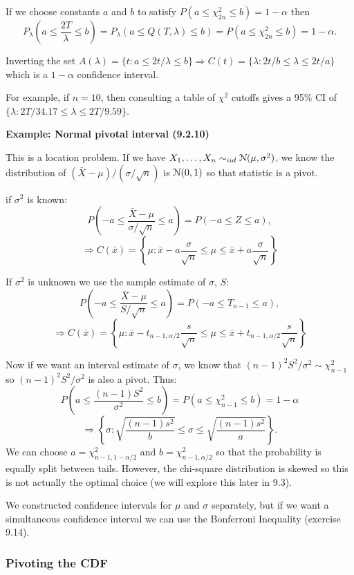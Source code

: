 \documentclass[11pt,]{article}
\newcommand{\Xndots}{X_1, \ldots, X_n}
\def\xbar{\bar{ x}}
\def\Xbar{\bar{ X}}
\def\Nsc{{\cal N}}
\begin{document}
If we choose constants \(a\) and \(b\) to satisfy
\(P(a \leq \chi^2_{2n} \leq b) = 1 - \alpha\) then
\[P_\lambda\left( a \leq \frac{2T}{\lambda} \leq b \right) = P_\lambda (a \leq Q(T,\lambda) \leq b) = P(a \leq \chi^2_{2n} \leq b) = 1 - \alpha.\]

Inverting the set
\(A(\lambda) = \{t: a \leq {2t/\lambda} \leq b\} \Rightarrow C(t) = \{ \lambda: 2t/b \leq \lambda \leq 2t/a\}\)
which is a \(1-\alpha\) confidence interval.

For example, if \(n=10\), then consulting a table of \(\chi^2\) cutoffs
gives a 95\% CI of \(\{\lambda: 2T/34.17 \leq \lambda \leq 2T/9.59\}.\)

\noindent\textbf{Example: Normal pivotal interval (9.2.10)}

This is a location problem. If we have
\(\Xndots \sim_{iid} \Nsc(\mu,\sigma^2)\), we know the distribution of
\((\Xbar - \mu)/(\sigma/\sqrt{n})\) is \(\Nsc(0,1)\) so that statistic
is a pivot.

if \(\sigma^2\) is known:
\[P\left(-a \leq \frac{\Xbar - \mu}{\sigma/\sqrt{n}} \leq a\right) = P(-a \leq Z \leq a),\]
\[ \Rightarrow C(\xbar) = \left\{ \mu: \xbar - a \frac{\sigma}{\sqrt{n}} \leq \mu \leq \xbar +  a \frac{\sigma}{\sqrt{n}}\right\}\]

If \(\sigma^2\) is unknown we use the sample estimate of \(\sigma\),
\(S\):
\[P\left(-a \leq \frac{\Xbar - \mu}{S/\sqrt{n}} \leq a\right) = P(-a \leq T_{n-1} \leq a),\]
\[ \Rightarrow C(\xbar) = \left\{ \mu: \xbar - t_{n-1,\alpha/2} \frac{s}{\sqrt{n}} \leq \mu \leq \xbar +  t_{n-1,\alpha/2} \frac{s}{\sqrt{n}}\right\}\]

Now if we want an interval estimate of \(\sigma\), we know that
\((n-1)^2S^2/\sigma^2 \sim \chi^2_{n-1}\) so \((n-1)^2S^2/\sigma^2\) is
also a pivot. Thus:
\[P\left(a \leq \frac{(n-1)S^2}{\sigma^2} \leq b \right) = P(a \leq \chi^2_{n-1} \leq b) = 1 - \alpha\]
\[\Rightarrow \left\{ \sigma: \sqrt{\frac{(n-1)s^2}{b}} \leq \sigma \leq  \sqrt{\frac{(n-1)s^2}{a}}\right\}.\]
We can choose \(a = \chi^2_{n-1,1-\alpha/2}\) and
\(b = \chi^2_{n-1,\alpha/2}\) so that the probability is equally split
between tails. However, the chi-square distribution is skewed so this is
not actually the optimal choice (we will explore this later in 9.3).

We constructed confidence intervals for \(\mu\) and \(\sigma\)
separately, but if we want a simultaneous confidence interval we can use
the Bonferroni Inequality (exercise 9.14).

\subsubsection{Pivoting the CDF}
\end{document}
